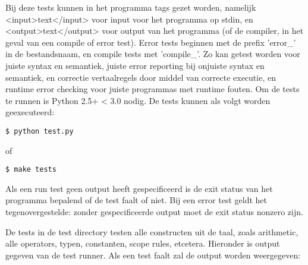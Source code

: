 \documentclass[]{article}
\begin{document}
Bij deze tests kunnen in het programma tags gezet worden, namelijk <input>text</input> voor input voor het programma op stdin, en <output>text</output> voor output van het programma (of de compiler, in het geval van een compile of error test). Error tests beginnen met de prefix 'error\_' in de bestandsnaam, en compile tests met 'compile\_'. Zo kan getest worden voor juiste syntax en semantiek, juiste error reporting bij onjuiste syntax en semantiek, en correctie vertaalregels door middel van correcte executie, en runtime error checking voor juiste programmas met runtime fouten. Om de tests te runnen is Python 2.5+ < 3.0 nodig. De tests kunnen als volgt worden geexecuteerd:

\begin{verbatim}
$ python test.py
\end{verbatim}

of

\begin{verbatim}
$ make tests
\end{verbatim}

Als een run test geen output heeft gespecificeerd is de exit status van het programma bepalend of de test faalt of niet. Bij een error test geldt het tegenovergestelde: zonder gespecificeerde output moet de exit status nonzero zijn.

De tests in de test directory testen alle constructen uit de taal, zoals arithmetic, alle operators, typen, constanten, scope rules, etcetera. Hieronder is output gegeven van de test runner. Als een test faalt zal de output worden weergegeven:
\end{document}
